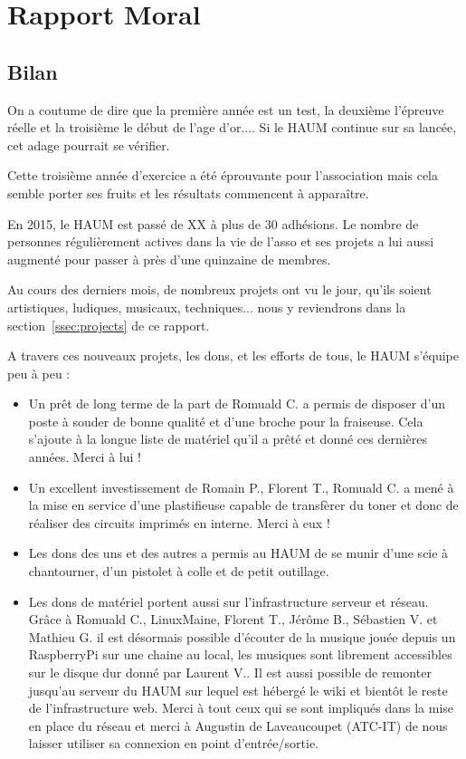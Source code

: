 \documentclass[11pt]{article}
\begin{document}


\section{Rapport Moral}


\subsection{Bilan}

On a coutume de dire que la première année est un test, la deuxième l'épreuve réelle et la troisième le début de l'age
d'or.... Si le HAUM continue sur sa lancée, cet adage pourrait se vérifier.

Cette troisième année d'exercice a été éprouvante pour l'association mais cela semble porter ses fruits et les résultats
commencent à apparaître.

En 2015, le HAUM est passé de XX à plus de 30 adhésions. Le nombre de personnes régulièrement actives dans la vie de l'asso
et ses projets a lui aussi augmenté pour passer à près d'une quinzaine de membres.

Au cours des derniers mois, de nombreux projets ont vu le jour, qu'ils soient artistiques, ludiques, musicaux,
techniques... nous y reviendrons dans la section~\ref{ssec:projects} de ce rapport.

A travers ces nouveaux projets, les dons, et les efforts de tous, le HAUM s'équipe peu à peu :

\begin{itemize}
	\item Un prêt de long terme de la part de Romuald C. a permis de disposer d'un poste à souder de bonne qualité et
		d'une broche pour la fraiseuse. Cela s'ajoute à la longue liste de matériel qu'il a prêté et donné ces dernières
		années. Merci à lui !
	\item Un excellent investissement de Romain P., Florent T., Romuald C. a mené à la mise en service d'une plastifieuse
		capable de transfèrer du toner et donc de réaliser des circuits imprimés en interne. Merci à eux !
	\item Les dons des uns et des autres a permis au HAUM de se munir d'une scie à chantourner, d'un pistolet à colle et
		de petit outillage.
	\item Les dons de matériel portent aussi sur l'infrastructure serveur et réseau. Grâce à Romuald C., LinuxMaine,
		Florent T., Jérôme B., Sébastien V. et Mathieu G. il est désormais possible d'écouter de la musique jouée depuis un
		RaspberryPi sur une chaine au local, les musiques sont librement accessibles sur le disque dur donné par Laurent
		V.. Il est aussi possible de remonter jusqu'au serveur du HAUM sur lequel est hébergé le wiki et bientôt le
		reste de l'infrastructure web. Merci à tout ceux qui se sont impliqués dans la mise en place du réseau et merci
		à Augustin de Laveaucoupet (ATC-IT) de nous laisser utiliser sa connexion en point d'entrée/sortie.
\end{itemize}
\end{document}
